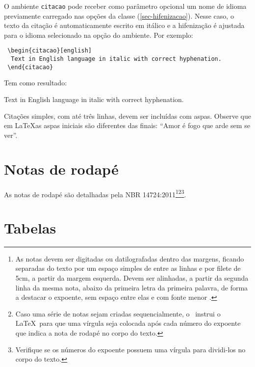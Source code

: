 \documentclass[12pt,oneside,a4paper,chapter=TITLE,
			   english,brazil]{abntex2}
\begin{document}
\begin{anexosenv}
O ambiente \texttt{citacao} pode receber como parâmetro opcional um nome de idioma previamente carregado nas opções da classe (\autoref{sec-hifenizacao}). Nesse caso, o texto da citação é automaticamente escrito em itálico e a hifenização é ajustada para o idioma selecionado na opção do ambiente. Por exemplo:
\begin{verbatim}
 \begin{citacao}[english]
  Text in English language in italic with correct hyphenation.
 \end{citacao}
\end{verbatim}

Tem como resultado:
\begin{citacao}[english]
Text in English language in italic with correct hyphenation.
\end{citacao}

Citações simples, com até três linhas, devem ser incluídas com aspas. Observe que em \LaTeX as aspas iniciais são diferentes das finais: ``Amor é fogo que arde sem se ver''.

\section{Notas de rodapé}

As notas de rodapé são detalhadas pela NBR 14724:2011\footnote{As notas devem ser digitadas ou datilografadas dentro das margens, ficando separadas do texto por um espaço simples de entre as linhas e por filete de 5cm, a partir da margem esquerda. Devem ser alinhadas, a partir da segunda linha da mesma nota, abaixo da primeira letra da primeira palavra, de forma a destacar o expoente, sem espaço entre elas e com fonte menor .}\footnote{Caso uma série de notas sejam criadas sequencialmente, o \abnTeX\ instrui o \LaTeX\ para que uma vírgula seja colocada após cada número do expoente que indica a nota de rodapé no corpo do texto.}\footnote{Verifique se os números do expoente possuem uma vírgula para dividi-los no corpo do texto.}. 

\section{Tabelas}


\end{anexosenv}
\end{document}

